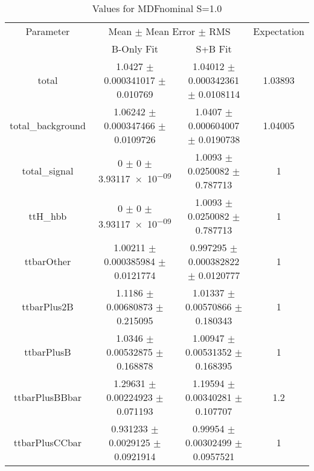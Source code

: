 \begin{table}
\centering
\caption{Values for MDFnominal S=1.0}
\begin{tabular}{cccc}
\toprule
Parameter & \multicolumn{2}{c}{Mean $\pm$ Mean Error $\pm$ RMS} & Expectation\\
 & B-Only Fit & S+B Fit & \\
\midrule
total & \num{1.0427} $\pm$ \num{0.000341017} $\pm$ \num{0.010769} & \num{1.04012} $\pm$ \num{0.000342361} $\pm$ \num{0.0108114} & \num{1.03893}\\
total\_background & \num{1.06242} $\pm$ \num{0.000347466} $\pm$ \num{0.0109726} & \num{1.0407} $\pm$ \num{0.000604007} $\pm$ \num{0.0190738} & \num{1.04005}\\
total\_signal & \num{0} $\pm$ \num{0} $\pm$ \num{3.93117e-09} & \num{1.0093} $\pm$ \num{0.0250082} $\pm$ \num{0.787713} & \num{1}\\
ttH\_hbb & \num{0} $\pm$ \num{0} $\pm$ \num{3.93117e-09} & \num{1.0093} $\pm$ \num{0.0250082} $\pm$ \num{0.787713} & \num{1}\\
ttbarOther & \num{1.00211} $\pm$ \num{0.000385984} $\pm$ \num{0.0121774} & \num{0.997295} $\pm$ \num{0.000382822} $\pm$ \num{0.0120777} & \num{1}\\
ttbarPlus2B & \num{1.1186} $\pm$ \num{0.00680873} $\pm$ \num{0.215095} & \num{1.01337} $\pm$ \num{0.00570866} $\pm$ \num{0.180343} & \num{1}\\
ttbarPlusB & \num{1.0346} $\pm$ \num{0.00532875} $\pm$ \num{0.168878} & \num{1.00947} $\pm$ \num{0.00531352} $\pm$ \num{0.168395} & \num{1}\\
ttbarPlusBBbar & \num{1.29631} $\pm$ \num{0.00224923} $\pm$ \num{0.071193} & \num{1.19594} $\pm$ \num{0.00340281} $\pm$ \num{0.107707} & \num{1.2}\\
ttbarPlusCCbar & \num{0.931233} $\pm$ \num{0.0029125} $\pm$ \num{0.0921914} & \num{0.99954} $\pm$ \num{0.00302499} $\pm$ \num{0.0957521} & \num{1}\\
\bottomrule
\end{tabular}
\end{table}